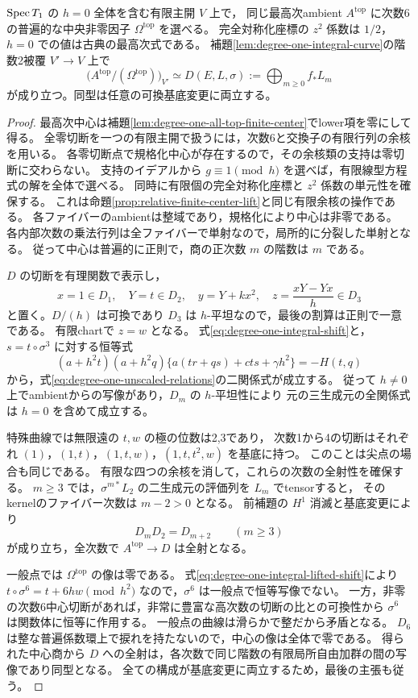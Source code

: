 \begin{theorem}\label{thm:degree-one-all-top-thcr}
$\operatorname{Spec} T_1$ の $h=0$ 全体を含む有限主開 $V$ 上で，
同じ最高次ambient $A^{\mathrm{top}}$ に次数6の普遍的な中央非零因子
$\Omega^{\mathrm{top}}$ を選べる。
完全対称化座標の $z^2$ 係数は $1/2$，$h=0$ での値は古典の最高次式である。
補題\ref{lem:degree-one-integral-curve}の階数2被覆 $V'\to V$ 上で
\[
 \bigl(A^{\mathrm{top}}/(\Omega^{\mathrm{top}})\bigr)_{V'}
       \simeq D(E,L,\sigma):=\bigoplus_{m\ge0}f_*L_m
\]
が成り立つ。同型は任意の可換基底変更に両立する。
\end{theorem}
\begin{proof}
最高次中心は補題\ref{lem:degree-one-all-top-finite-center}でlower項を零にして得る。
全零切断を一つの有限主開で扱うには，次数6と交換子の有限行列の余核を用いる。
各零切断点で規格化中心が存在するので，その余核類の支持は零切断に交わらない。
支持のイデアルから $g\equiv1\pmod h$ を選べば，有限線型方程式の解を全体で選べる。
同時に有限個の完全対称化座標と $z^2$ 係数の単元性を確保する。
これは命題\ref{prop:relative-finite-center-lift}と同じ有限余核の操作である。
各ファイバーのambientは整域であり，規格化により中心は非零である。
各内部次数の乗法行列は全ファイバーで単射なので，局所的に分裂した単射となる。
従って中心は普遍的に正則で，商の正次数 $m$ の階数は $m$ である。

$D$ の切断を有理関数で表示し，
\[
 x=1\in D_1,\quad Y=t\in D_2,\quad
 y=Y+kx^2,\quad z=\frac{xY-Yx}{h}\in D_3
\]
と置く。$D/(h)$ は可換であり $D_3$ は $h$-平坦なので，最後の割算は正則で一意である。
有限chartで $z=w$ となる。
式\eqref{eq:degree-one-integral-shift}と，$s=t\circ\sigma^3$ に対する恒等式
\[
 (a+h^2t)(a+h^2q)\{a(tr+qs)+cts+\gamma h^2\}=-H(t,q)
\]
から，式\eqref{eq:degree-one-unscaled-relations}の二関係式が成立する。
従って $h\ne0$ 上でambientからの写像があり，$D_m$ の $h$-平坦性により
元の三生成元の全関係式は $h=0$ を含めて成立する。

特殊曲線では無限遠の $t,w$ の極の位数は2,3であり，
次数1から4の切断はそれぞれ
$(1)$，$(1,t)$，$(1,t,w)$，$(1,t,t^2,w)$ を基底に持つ。
このことは尖点の場合も同じである。
有限な四つの余核を消して，これらの次数の全射性を確保する。
$m\ge3$ では，$\sigma^{m*}L_2$ の二生成元の評価列を $L_m$ でtensorすると，
そのkernelのファイバー次数は $m-2>0$ となる。
前補題の $H^1$ 消滅と基底変更により
\[
 D_mD_2=D_{m+2}\qquad(m\ge3)
\]
が成り立ち，全次数で $A^{\mathrm{top}}\to D$ は全射となる。

一般点では $\Omega^{\mathrm{top}}$ の像は零である。
式\eqref{eq:degree-one-integral-lifted-shift}により
$t\circ\sigma^6=t+6hw\pmod {h^2}$ なので，$\sigma^6$ は一般点で恒等写像でない。
一方，非零の次数6中心切断があれば，非常に豊富な高次数の切断の比との可換性から
$\sigma^6$ は関数体に恒等に作用する。
一般点の曲線は滑らかで整だから矛盾となる。
$D_6$ は整な普遍係数環上で捩れを持たないので，中心の像は全体で零である。
得られた中心商から $D$ への全射は，各次数で同じ階数の有限局所自由加群の間の写像であり同型となる。
全ての構成が基底変更に両立するため，最後の主張も従う。
\end{proof}

